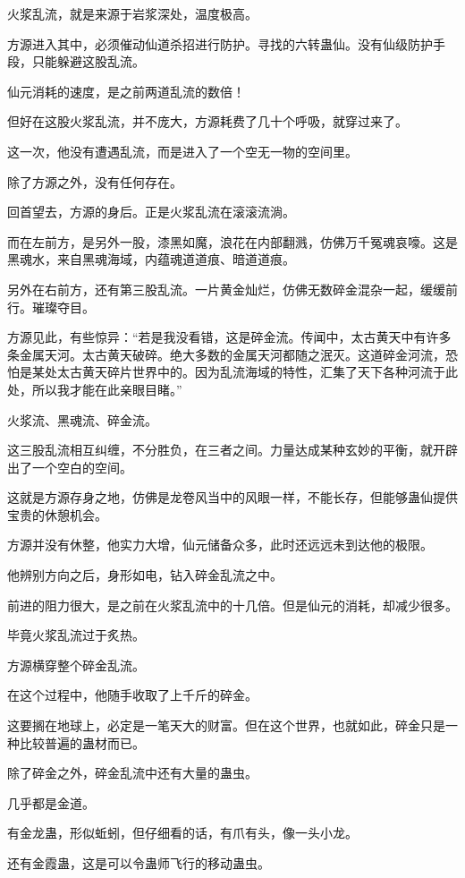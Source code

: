 \begin{this_body}
火浆乱流，就是来源于岩浆深处，温度极高。

方源进入其中，必须催动仙道杀招进行防护。寻找的六转蛊仙。没有仙级防护手段，只能躲避这股乱流。

仙元消耗的速度，是之前两道乱流的数倍！

但好在这股火浆乱流，并不庞大，方源耗费了几十个呼吸，就穿过来了。

这一次，他没有遭遇乱流，而是进入了一个空无一物的空间里。

除了方源之外，没有任何存在。

回首望去，方源的身后。正是火浆乱流在滚滚流淌。

而在左前方，是另外一股，漆黑如魔，浪花在内部翻溅，仿佛万千冤魂哀嚎。这是黑魂水，来自黑魂海域，内蕴魂道道痕、暗道道痕。

另外在右前方，还有第三股乱流。一片黄金灿烂，仿佛无数碎金混杂一起，缓缓前行。璀璨夺目。

方源见此，有些惊异：“若是我没看错，这是碎金流。传闻中，太古黄天中有许多条金属天河。太古黄天破碎。绝大多数的金属天河都随之泯灭。这道碎金河流，恐怕是某处太古黄天碎片世界中的。因为乱流海域的特性，汇集了天下各种河流于此处，所以我才能在此亲眼目睹。”

火浆流、黑魂流、碎金流。

这三股乱流相互纠缠，不分胜负，在三者之间。力量达成某种玄妙的平衡，就开辟出了一个空白的空间。

这就是方源存身之地，仿佛是龙卷风当中的风眼一样，不能长存，但能够蛊仙提供宝贵的休憩机会。

方源并没有休整，他实力大增，仙元储备众多，此时还远远未到达他的极限。

他辨别方向之后，身形如电，钻入碎金乱流之中。

前进的阻力很大，是之前在火浆乱流中的十几倍。但是仙元的消耗，却减少很多。

毕竟火浆乱流过于炙热。

方源横穿整个碎金乱流。

在这个过程中，他随手收取了上千斤的碎金。

这要搁在地球上，必定是一笔天大的财富。但在这个世界，也就如此，碎金只是一种比较普遍的蛊材而已。

除了碎金之外，碎金乱流中还有大量的蛊虫。

几乎都是金道。

有金龙蛊，形似蚯蚓，但仔细看的话，有爪有头，像一头小龙。

还有金霞蛊，这是可以令蛊师飞行的移动蛊虫。


\end{this_body}
